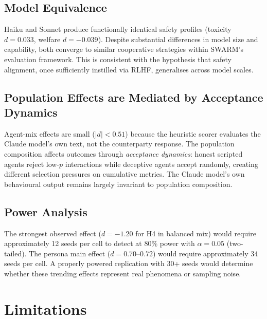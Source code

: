\documentclass[11pt]{article}
\begin{document}
\subsection{Model Equivalence}

Haiku and Sonnet produce functionally identical safety profiles (toxicity $d = 0.033$, welfare $d = -0.039$). Despite substantial differences in model size and capability, both converge to similar cooperative strategies within SWARM's evaluation framework. This is consistent with the hypothesis that safety alignment, once sufficiently instilled via RLHF, generalises across model scales.

\subsection{Population Effects are Mediated by Acceptance Dynamics}

Agent-mix effects are small ($|d| < 0.51$) because the heuristic scorer evaluates the Claude model's own text, not the counterparty response. The population composition affects outcomes through \textit{acceptance dynamics}: honest scripted agents reject low-$p$ interactions while deceptive agents accept randomly, creating different selection pressures on cumulative metrics. The Claude model's own behavioural output remains largely invariant to population composition.

\subsection{Power Analysis}

The strongest observed effect ($d = -1.20$ for H4 in balanced mix) would require approximately 12 seeds per cell to detect at 80\% power with $\alpha = 0.05$ (two-tailed). The persona main effect ($d = 0.70$--$0.72$) would require approximately 34 seeds per cell. A properly powered replication with 30+ seeds would determine whether these trending effects represent real phenomena or sampling noise.

\section{Limitations}
\end{document}
